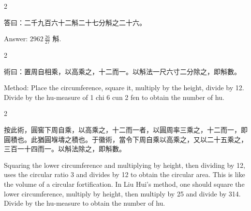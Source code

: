 \documentclass[10pt,a4paper]{article}
\begin{document}
\begin{paracol}{2}

\begin{leftcolumn*}
\begin{answerbi}[\textbf{答}]
答曰：二千九百六十二斛二十七分斛之二十六。
\end{answerbi}
\end{leftcolumn*}

\begin{rightcolumn*}
\begin{answerbi}
Answer: $2962\,\frac{26}{27}$ 斛.
\end{answerbi}
\end{rightcolumn*}

\end{paracol}

\begin{paracol}{2}

\begin{leftcolumn*}
\begin{methodbi}[\textbf{術}]
術曰：置周自相乘，以高乘之，十二而一。以斛法一尺六寸二分除之，即斛數。
\end{methodbi}
\end{leftcolumn*}

\begin{rightcolumn*}
\begin{methodbi}
Method: Place the circumference, square it, multiply by the height, divide by 12. Divide by the hu-measure of 1 chi 6 cun 2 fen to obtain the number of hu.
\end{methodbi}
\end{rightcolumn*}

\end{paracol}

\begin{paracol}{2}

\begin{leftcolumn*}
\begin{commentarybi}
按此術，圓窖下周自乘，以高乘之，十二而一者，以圓周率三乘之，十二而一，即圓積也。此猶圓堢壔之積也。于徽術，當令下周自乘以高乘之，又以二十五乘之，三百一十四而一。以斛法除之，即斛數。
\end{commentarybi}
\end{leftcolumn*}

\begin{rightcolumn*}
\begin{commentarybi}
Squaring the lower circumference and multiplying by height, then dividing by 12, uses the circular ratio 3 and divides by 12 to obtain the circular area. This is like the volume of a circular fortification. In Liu Hui's method, one should square the lower circumference, multiply by height, then multiply by 25 and divide by 314. Divide by the hu-measure to obtain the number of hu.
\end{commentarybi}
\end{rightcolumn*}

\end{paracol}
\end{document}
